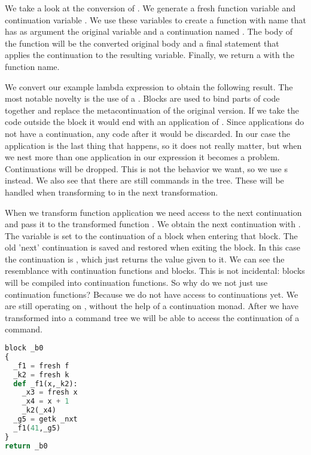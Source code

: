 We take a look at the conversion of . We generate a fresh function variable  and continuation variable . We use these variables to create a function with name  that has as argument the original variable and a continuation named . The body of the function will be the converted original body and a final statement that applies the continuation to the resulting variable. Finally, we return a  with the function name.

We convert our example lambda expression  to obtain the following result. The most notable novelty is the use of a . Blocks are used to bind parts of code together and replace the metacontinuation of the original version. If we take the code outside the block it would end with an application of . Since applications do not have a continuation, any code after it would be discarded. In our case the application is the last thing that happens, so it does not really matter, but when we nest more than one application in our expression it becomes a problem. Continuations will be dropped. This is not the behavior we want, so we use s instead. We also see that there are still  commands in the tree. These will be handled when transforming to  in the next transformation.

When we transform function application we need access to the next continuation and pass it to the transformed function . We obtain the next continuation with . The variable  is set to the continuation of a block when entering that block. The old 'next' continuation is saved and restored when exiting the block. In this case the continuation is , which just returns the value given to it. We can see the resemblance with continuation functions and blocks. This is not incidental: blocks will be compiled into continuation functions. So why do we not just use continuation functions? Because we do not have access to continuations yet. We are still operating on , without the help of a continuation monad. After we have transformed into a command tree we will be able to access the continuation of a command.

\begin{lstlisting}[language=Python]
block _b0
{
  _f1 = fresh f
  _k2 = fresh k
  def _f1(x,_k2):
    _x3 = fresh x
    _x4 = x + 1
    _k2(_x4)
  _g5 = getk _nxt
  _f1(41,_g5)
}
return _b0
\end{lstlisting}

